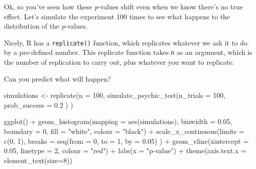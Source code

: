 \documentclass[
]{book}
\newenvironment{Shaded}{\begin{snugshade}}{\end{snugshade}}
\newcommand{\AttributeTok}[1]{\textcolor[rgb]{0.77,0.63,0.00}{#1}}
\newcommand{\DecValTok}[1]{\textcolor[rgb]{0.00,0.00,0.81}{#1}}
\newcommand{\FloatTok}[1]{\textcolor[rgb]{0.00,0.00,0.81}{#1}}
\newcommand{\FunctionTok}[1]{\textcolor[rgb]{0.00,0.00,0.00}{#1}}
\newcommand{\NormalTok}[1]{#1}
\newcommand{\OtherTok}[1]{\textcolor[rgb]{0.56,0.35,0.01}{#1}}
\newcommand{\SpecialCharTok}[1]{\textcolor[rgb]{0.00,0.00,0.00}{#1}}
\newcommand{\StringTok}[1]{\textcolor[rgb]{0.31,0.60,0.02}{#1}}
\begin{document}
Ok, so you've seen how these \emph{p}-values shift even when we know there's no true effect. Let's simulate the experiment 100 times to see what happens to the distribution of the \emph{p}-values.

Nicely, R has a \texttt{replicate()} function, which replicates whatever we ask it to do by a pre-defined number. This replicate function takes \texttt{n} as an argument, which is the number of replication to carry out, plus whatever you want to replicate.

Can you predict what will happen?

\begin{Shaded}
\begin{Highlighting}[]
\NormalTok{simulations }\OtherTok{\textless{}{-}} \FunctionTok{replicate}\NormalTok{(}\AttributeTok{n =} \DecValTok{100}\NormalTok{, }
                         \FunctionTok{simulate\_psychic\_test}\NormalTok{(}\AttributeTok{n\_trials =} \DecValTok{100}\NormalTok{, }
                                               \AttributeTok{prob\_success =} \FloatTok{0.2}
\NormalTok{                                               )}
\NormalTok{                         )}
\end{Highlighting}
\end{Shaded}

\begin{Shaded}
\begin{Highlighting}[]
\FunctionTok{ggplot}\NormalTok{() }\SpecialCharTok{+} 
  \FunctionTok{geom\_histogram}\NormalTok{(}\AttributeTok{mapping =} \FunctionTok{aes}\NormalTok{(simulations),}
                 \AttributeTok{binwidth =} \FloatTok{0.05}\NormalTok{,}
                 \AttributeTok{boundary =} \DecValTok{0}\NormalTok{,}
                 \AttributeTok{fill =} \StringTok{"white"}\NormalTok{,}
                 \AttributeTok{colour =} \StringTok{"black"}\NormalTok{) }\SpecialCharTok{+}
  \FunctionTok{scale\_x\_continuous}\NormalTok{(}\AttributeTok{limits =} \FunctionTok{c}\NormalTok{(}\DecValTok{0}\NormalTok{, }\DecValTok{1}\NormalTok{), }
                     \AttributeTok{breaks =} \FunctionTok{seq}\NormalTok{(}\AttributeTok{from =} \DecValTok{0}\NormalTok{, }\AttributeTok{to =} \DecValTok{1}\NormalTok{, }\AttributeTok{by =} \FloatTok{0.05}\NormalTok{)}
\NormalTok{                     ) }\SpecialCharTok{+}
  \FunctionTok{geom\_vline}\NormalTok{(}\AttributeTok{xintercept =} \FloatTok{0.05}\NormalTok{, }\AttributeTok{linetype =} \DecValTok{2}\NormalTok{, }\AttributeTok{colour =} \StringTok{"red"}\NormalTok{) }\SpecialCharTok{+}
  \FunctionTok{labs}\NormalTok{(}\AttributeTok{x =} \StringTok{"p{-}value"}\NormalTok{) }\SpecialCharTok{+}
  \FunctionTok{theme}\NormalTok{(}\AttributeTok{axis.text.x =} \FunctionTok{element\_text}\NormalTok{(}\AttributeTok{size=}\DecValTok{8}\NormalTok{))}
\end{Highlighting}
\end{Shaded}
\end{document}
